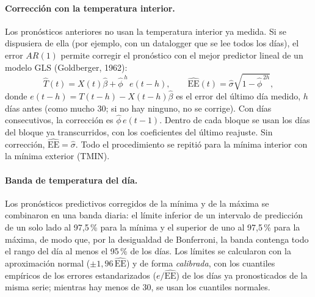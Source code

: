 \documentclass[11pt,a4paper]{article}
\begin{document}
\paragraph{Corrección con la temperatura interior.} Los pronósticos anteriores no usan la temperatura interior ya medida. Si se dispusiera de ella (por ejemplo, con un datalogger que se lee todos los días), el error $AR(1)$ permite corregir el pronóstico con el mejor predictor lineal de un modelo GLS (Goldberger, 1962):
\begin{equation*}
    \hat T(t) = X(t)\hat\beta + \hat\phi^{\,h}\, e(t-h), \qquad \widehat{\mathrm{EE}}(t) = \hat\sigma\sqrt{1-\hat\phi^{\,2h}},
\end{equation*}
donde $e(t-h) = T(t-h) - X(t-h)\hat\beta$ es el error del último día medido, $h$ días antes (como mucho 30; si no hay ninguno, no se corrige). Con días consecutivos, la corrección es $\hat\phi\, e(t-1)$. Dentro de cada bloque se usan los días del bloque ya transcurridos, con los coeficientes del último reajuste. Sin corrección, $\widehat{\mathrm{EE}} = \hat\sigma$. Todo el procedimiento se repitió para la mínima interior con la mínima exterior (TMIN).

\paragraph{Banda de temperatura del día.} Los pronósticos predictivos corregidos de la mínima y de la máxima se combinaron en una banda diaria: el límite inferior de un intervalo de predicción de un solo lado al 97{,}5\,\% para la mínima y el superior de uno al 97{,}5\,\% para la máxima, de modo que, por la desigualdad de Bonferroni, la banda contenga todo el rango del día al menos el 95\,\% de los días. Los límites se calcularon con la aproximación normal ($\pm 1{,}96\,\widehat{\mathrm{EE}}$) y de forma \textit{calibrada}, con los cuantiles empíricos de los errores estandarizados ($e/\widehat{\mathrm{EE}}$) de los días ya pronosticados de la misma serie; mientras hay menos de 30, se usan los cuantiles normales.
\end{document}
